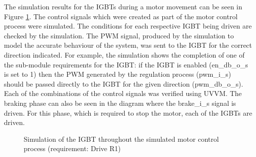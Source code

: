 The simulation results for the IGBTs during a motor movement can be seen in Figure \ref{igbt_sim}. The control signals which were created as part of the motor control process were simulated. The conditions for each respective IGBT being driven are checked by the simulation. The PWM signal, produced by the simulation to model the accurate behaviour of the system, was sent to the IGBT for the correct direction indicated. For example, the simulation shows the completion of one of the sub-module requirements for the IGBT: if the IGBT is enabled (en\_db\_o\_s is set to 1) then the PWM generated by the regulation process (pwm\_i\_s) should be passed directly to the IGBT for the given direction (pwm\_db\_o\_s). Each of the combinations of the control signals was verified using UVVM. The braking phase can also be seen in the diagram where the brake\_i\_s signal is driven. For this phase, which is required to stop the motor, each of the IGBTs are driven. 

\begin{figure}[h]
\centering
{}
\caption{Simulation of the IGBT throughout the simulated motor control process (requirement: Drive R1)}
\label{igbt_sim}
\end{figure}



